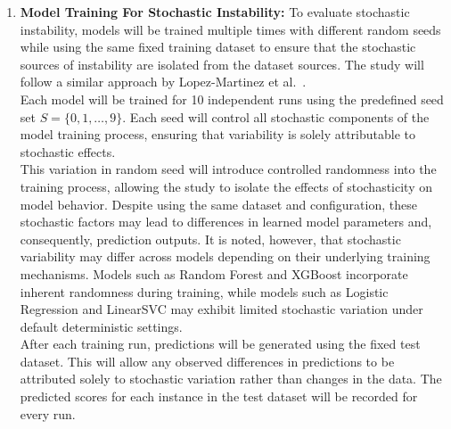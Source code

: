 \documentclass[12pt]{article}
\begin{document}
\begin{enumerate}
  Each model will then be retrained independently on every bootstrapped sample with a fixed random seed of $ s = 0$. After training, predictions will be generated using the fixed test dataset and stored in structured CSV files with the filename $<model>\_bs\_pred.csv$, where each column represents the predicted scores from a specific training run. This organized storage will enable direct comparison of predictions across multiple runs for each individual.\\

  By repeating this process across all bootstrapped samples, the study will produce a distribution of predictions for each test instance which will serve as the basis for computing instability metrics in later stages of the methodology.

  \item \textbf{Model Training For Stochastic Instability:}
  To evaluate stochastic instability, models will be trained multiple times with different random seeds while using the same fixed training dataset to ensure that the stochastic sources of instability are isolated from the dataset sources. The study will follow a similar approach by Lopez-Martinez et al.~\cite{lopez2022instability}.\\

  Each model will be trained for 10 independent runs using the predefined seed set $S = \{0,1,\dots,9\}$. Each seed will control all stochastic components of the model training process, ensuring that variability is solely attributable to stochastic effects.\\

  This variation in random seed will introduce controlled randomness into the training process, allowing the study to isolate the effects of stochasticity on model behavior. Despite using the same dataset and configuration, these stochastic factors may lead to differences in learned model parameters and, consequently, prediction outputs. It is noted, however, that stochastic variability may differ across models depending on their underlying training mechanisms. Models such as Random Forest and XGBoost incorporate inherent randomness during training, while models such as Logistic Regression and LinearSVC may exhibit limited stochastic variation under default deterministic settings.\\

  After each training run, predictions will be generated using the fixed test dataset. This will allow any observed differences in predictions to be attributed solely to stochastic variation rather than changes in the data. The predicted scores for each instance in the test dataset will be recorded for every run. \\


\end{enumerate}
\end{document}
